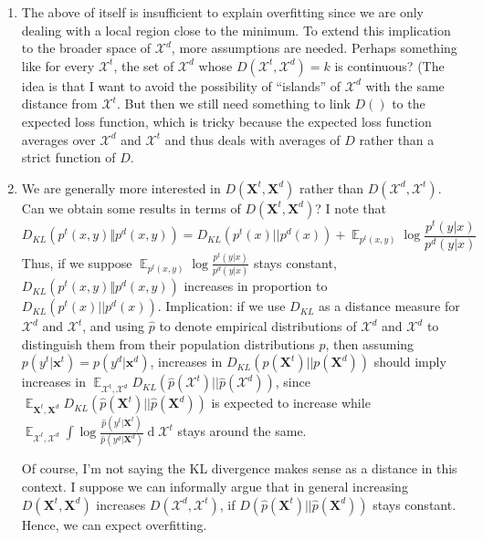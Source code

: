 \documentclass[12pt]{article}
\DeclareMathOperator{\D}{d}
\DeclareMathOperator{\E}{\mathbb{E}}
\begin{document}
	\begin{enumerate}
		\item The above of itself is insufficient to explain overfitting since we are only dealing with a local region close to the minimum. To extend this implication to the broader space of $\mathcal{X}^d$, more assumptions are needed. Perhaps something like for every $\mathcal{X}^t$, the set of $\mathcal{X}^d$ whose $D(\mathcal{X}^t, \mathcal{X}^d)=k$ is continuous? (The idea is that I want to avoid the possibility of ``islands'' of $\mathcal{X}^d$ with the same distance from $\mathcal{X}^t$. But then we still need something to link $D()$ to the expected loss function, which is tricky because the expected loss function averages over $\mathcal{X}^d$ and $\mathcal{X}^t$ and thus deals with averages of $D$ rather than a strict function of $D$. 
		\item We are generally more interested in $D(\boldsymbol{X}^t, \boldsymbol{X}^d)$ rather than $D(\mathcal{X}^d, \mathcal{X}^t)$. Can we obtain some results in terms of $D(\boldsymbol{X}^t, \boldsymbol{X}^d)$? I note that 
		\begin{equation}
			D_{KL} (p^t(x,y) \Vert p^d(x,y)) = D_{KL}(p^t(x) || p^d(x)) + \E_{p^t(x,y)}\log \frac{p^t(y|x)}{p^d(y|x) } 
		\end{equation}
		Thus, if we suppose $\E_{p^t(x,y)}\log \frac{p^t(y|x)}{p^d(y|x) }$ stays constant, $D_{KL} (p^t(x,y) \Vert p^d(x,y)) $ increases in proportion to $D_{KL}(p^t(x) || p^d(x)) $. Implication: if we use $D_{KL}$ as a distance measure for $\mathcal{X}^d$ and $\mathcal{X}^t$, and using $\hat{p}$ to denote empirical distributions of $\mathcal{X}^d$ and $\mathcal{X}^d$ to distinguish them from their population distributions $p$, then assuming $p(y^t|\boldsymbol{x}^t) = p(y^d|\boldsymbol{x}^d)$, increases in $D_{KL}(p(\boldsymbol{X}^t)||p(\boldsymbol{X}^d))$ should imply increases in $\E_{\mathcal{X}^t, \mathcal{X}^d} D_{KL}(\hat{p}(\mathcal{X}^t)||\hat{p}(\mathcal{X}^d))$, since $\E_{\boldsymbol{X}^t, \boldsymbol{X}^d} D_{KL} (\hat{p}(\boldsymbol{X}^t)||\hat{p}(\boldsymbol{X}^d))$ is expected to increase while $\E_{\mathcal{X}^t, \mathcal{X}^d} \int \log \frac{\hat{p}(y^t|\boldsymbol{X}^t)}{\hat{p}(y^d|\boldsymbol{X}^d)} \D \mathcal{X}^t$ stays around the same.  
		
		Of course, I'm not saying the KL divergence makes sense as a distance in this context. I suppose we can informally argue that in general increasing $D(\boldsymbol{X}^t, \boldsymbol{X}^d)$ increases $D(\mathcal{X}^d, \mathcal{X}^t)$, if $D (\hat{p}(\boldsymbol{X}^t)||\hat{p}(\boldsymbol{X}^d))$ stays constant. Hence, we can expect overfitting. 
		

\end{enumerate}
\end{document}
